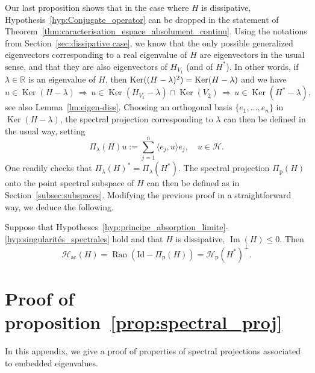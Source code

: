 \documentclass[10pt]{amsart}
\theoremstyle{definition}\newtheorem{defi}[theo]{Definition}\newtheorem{rema}[theo]{Remark}\newtheorem{exam}[theo]{Example}\newtheorem{exem}[theo]{Example}\newtheorem{nota}[theo]{Notation}
\newcommand{\Hi}{\mathcal{H}}
\newcommand{\R}{\mathbb{R}}
\newcommand{\rmp}{\mathrm{p}}
\newcommand{\acr}{\mathrm{ac}}
\DeclareMathOperator{\Ran}{Ran}
\DeclareMathOperator{\Ker}{Ker}
\DeclareMathOperator{\im}{Im}
\begin{document}
Our last proposition shows that in the case where $H$ is dissipative, Hypothesis~\ref{hyp:Conjugate_operator} can be dropped in the statement of Theorem~\ref{thm:caracterisation_espace_absolument_continu}. Using the notations from Section~\ref{sec:dissipative case}, we know that the only possible generalized eigenvectors corresponding to a real eigenvalue of $H$ are eigenvectors in the usual sense, and that they are also eigenvectors of $H_{V_1}$ (and of $H^*$). In other words, if $\lambda\in\R$ is an eigenvalue of $H$, then $\Ker((H-\lambda)^2)\linebreak=\Ker(H-\lambda)$ and we have
\begin{equation*}
u\in\Ker(H-\lambda)\,\Rightarrow\,u\in\Ker(H_{V_1}-\lambda)\cap\Ker(V_2)\,\Rightarrow\,u\in\Ker(H^*-\lambda),
\end{equation*}
see also Lemma~\ref{lm:eigen-diss}. Choosing an orthogonal basis $\{e_1,\dots,e_n\}$ in $\Ker(H-\lambda)$, the spectral projection corresponding to $\lambda$ can then be defined in the usual way, setting
\begin{equation*}
\Pi_\lambda(H)u:=\sum_{j=1}^n\langle e_j,u\rangle e_j, \quad u\in\Hi.
\end{equation*}
One readily checks that $\Pi_\lambda(H)^*=\Pi_\lambda(H^*)$. The spectral projection $\Pi_{\rmp}(H)$ onto the point spectral subspace of $H$ can then be defined as in Section~\ref{subsec:subspaces}. Modifying the previous proof in a straightforward way, we deduce the following.

\begin{prop}\label{prop:ac-diss}
Suppose that Hypotheses~\ref{hyp:principe_absorption_limite}-\ref{hyp:singularités_spectrales} hold and that $H$ is dissipative, $\im(H)\le 0$. Then
\begin{equation*}
\Hi_\acr(H)=\Ran(\mathrm{Id}-\Pi_\rmp(H))=\Hi_\rmp(H^*)^\perp.
\end{equation*}
\end{prop}


\appendix

\section{Proof of proposition~\ref{prop:spectral_proj}}\label{App:proof projection embedded}

In this appendix, we give a proof of properties of spectral projections associated to embedded eigenvalues.
\end{document}
